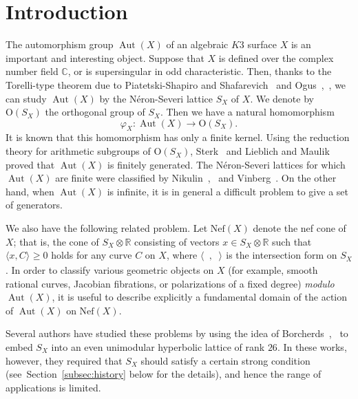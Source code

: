 \documentclass{amsart}
\theoremstyle{plain}
\theoremstyle{definition}
\theoremstyle{remark}
\numberwithin{equation}{section}
\numberwithin{table}{section}
\numberwithin{figure}{section}
\newcommand{\C}{\mathord{\mathbb C}}
\newcommand{\R}{\mathord{\mathbb R}}
\newcommand{\tensor}{\otimes}
\newcommand{\OG}{\mathord{\mathrm {O}}}
\newcommand{\Aut}{\operatorname{\mathrm {Aut}}\nolimits}
\newcommand{\Nef}{\mathord{\mathrm{Nef}}}
\newcommand{\intM}[2]{\langle{#1}\rangle_{#2}}
\begin{document}
\section{Introduction}\label{sec:Intro}
%
The automorphism group $\Aut(X)$ of an algebraic  $K3$ surface $X$ is 
an important and interesting object.
Suppose that $X$ is defined over the complex number field $\C$,
or is supersingular in odd characteristic.
Then, thanks to  the Torelli-type theorem
due to  Piatetski-Shapiro and Shafarevich~\cite{MR0284440} 
and Ogus~\cite{MR563467},~\cite{MR717616},
we can study $\Aut(X)$ by the N\'eron-Severi lattice $S_X$ of $X$.
We denote by  $\OG(S_X)$ the orthogonal group of $S_X$.
Then we have a natural homomorphism
%
\begin{equation*}\label{eq:naturalhom}
\varphi_X\colon  \Aut(X) \to \OG(S_X).
\end{equation*}
%
It is known that this homomorphism has only  a finite kernel.
Using the reduction theory for arithmetic subgroups of $\OG(S_X)$, 
Sterk~\cite{MR786280} and Lieblich and Maulik~\cite{arXiv11023377} 
proved that $\Aut(X)$ is finitely generated.
The N\'eron-Severi lattices for which  $\Aut(X)$ are finite were classified by
Nikulin~\cite{MR633160},~\cite{MR1802343} and Vinberg~\cite{MR2429266}.
On the other hand,
when $\Aut(X)$ is infinite, 
it is in general a  difficult problem to give a set of generators.
\par
We also have the following related problem.
Let $\Nef(X)$ denote the nef cone of $X$;  that is, the cone of $S_X\tensor \R$ consisting of vectors
$x\in S_X\tensor \R$  such that $\intM{x, C}{}\ge 0$ holds for any curve $C$ on $X$,
where  $\intM{\phantom{a}, \phantom{a}}{}$ is the intersection form on $S_X$.
In order to classify various geometric objects on $X$
(for example, smooth rational curves, Jacobian fibrations, or polarizations of a fixed degree)
\emph{modulo} $\Aut(X)$, 
it is useful to describe explicitly a fundamental domain  %
of the action of $\Aut(X)$ on $\Nef(X)$. %
\par
Several authors have studied these problems 
 by using the idea of Borcherds~\cite{MR913200},~\cite{MR1654763}
to embed $S_X$ into an even unimodular hyperbolic lattice of rank $26$.
In these works, however,
they required that $S_X$ should satisfy a certain strong condition
(see~Section~\ref{subsec:history} below for the details),
and hence the range of applications is limited.
\par
\end{document}
